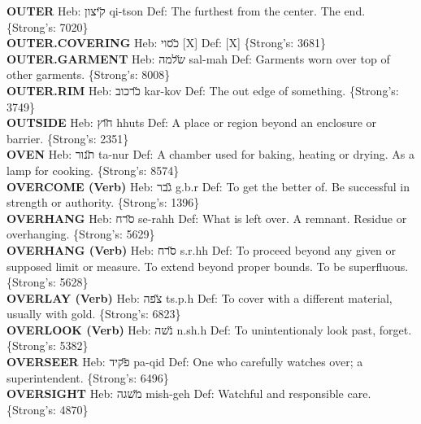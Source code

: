 {\textbf{OUTER} Heb: {\large\H קיצון} qi-tson Def: The furthest from the center. The end. \{Strong's: 7020\}\hfill{}\\

\textbf{OUTER.COVERING} Heb: {\large\H כסוי} {[}X{]} Def: {[}X{]} \{Strong's: 3681\}\hfill{}\\

\textbf{OUTER.GARMENT} Heb: {\large\H שלמה} sal-mah Def: Garments worn over top of other garments. \{Strong's: 8008\}\hfill{}\\

\textbf{OUTER.RIM} Heb: {\large\H כרכוב} kar-kov Def: The out edge of something. \{Strong's: 3749\}\hfill{}\\

\textbf{OUTSIDE} Heb: {\large\H חוץ} hhuts Def: A place or region beyond an enclosure or barrier. \{Strong's: 2351\}\hfill{}\\

\textbf{OVEN} Heb: {\large\H תנור} ta-nur Def: A chamber used for baking, heating or drying. As a lamp for cooking. \{Strong's: 8574\}\hfill{}\\

\textbf{OVERCOME (Verb)} Heb: {\large\H גבר} g.b.r Def: To get the better of. Be successful in strength or authority. \{Strong's: 1396\}\hfill{}\\

\textbf{OVERHANG} Heb: {\large\H סרח} se-rahh Def: What is left over. A remnant. Residue or overhanging. \{Strong's: 5629\}\hfill{}\\

\textbf{OVERHANG (Verb)} Heb: {\large\H סרח} s.r.hh Def: To proceed beyond any given or supposed limit or measure. To extend beyond proper bounds. To be superfluous. \{Strong's: 5628\}\hfill{}\\

\textbf{OVERLAY (Verb)} Heb: {\large\H צפה} ts.p.h Def: To cover with a different material, usually with gold. \{Strong's: 6823\}\hfill{}\\

\textbf{OVERLOOK (Verb)} Heb: {\large\H נשה} n.sh.h Def: To unintentionaly look past, forget. \{Strong's: 5382\}\hfill{}\\

\textbf{OVERSEER} Heb: {\large\H פקיד} pa-qid Def: One who carefully watches over; a superintendent. \{Strong's: 6496\}\hfill{}\\

\textbf{OVERSIGHT} Heb: {\large\H משגה} mish-geh Def: Watchful and responsible care. \{Strong's: 4870\}\hfill{}\\

}
